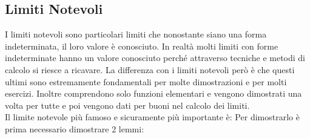 \subsection{Limiti Notevoli} \label{sec_limitiNotevoli}
I limiti notevoli sono particolari limiti che nonostante siano una forma indeterminata, il loro valore è conosciuto. In realtà molti limiti con forme indeterminate hanno un valore conosciuto perché attraverso tecniche e metodi di calcolo si riesce a ricavare. La differenza con i limiti notevoli però è che questi ultimi sono estremamente fondamentali per molte dimostrazioni e per molti esercizi. Inoltre comprendono solo funzioni elementari e vengono dimostrati una volta per tutte e poi vengono dati per buoni nel calcolo dei limiti.\\
Il limite notevole più famoso e sicuramente più importante è:
Per dimostrarlo è prima necessario dimostrare 2 lemmi:
